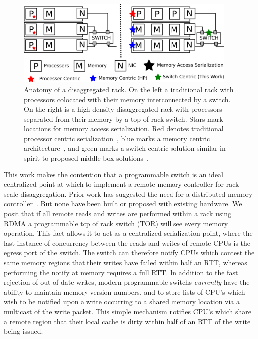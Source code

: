 \begin{figure}
      \centering
      \includegraphics[width=0.95\textwidth]{fig/overview.png}
      \caption{Anatomy of a disaggregated rack. On the left a
      traditional rack with processors colocated with their memory
      interconnected by a switch. On the right is a high density
      disaggregated rack with processors separated from their memory
      by a top of rack switch. Stars mark locations for memory access
      serialization. Red denotes traditional processor centric
      serialization~\cite{clover, storm, memc3, cell, sonuma}, blue marks a
      memory centric architecture~\cite{aguilera2019designing}, and
      green marks a switch centric solution similar in spirit to
      proposed middle box solutions~\cite{254120}.
      }
      \label{fig:overview}
\end{figure}


This work makes the contention that a programmable switch is an ideal
centralized point at which to implement a remote memory controller for
rack scale disaggregation. Prior work has suggested the need for a
distributed memory controller~\cite{254120}. But none have been built
or proposed with existing hardware. We posit that if all remote reads
and writes are performed within a rack using RDMA a programmable top
of rack switch (TOR) will see every memory operation. This fact allows
it to act as a centralized serialization point, where the last
instance of concurrency between the reads and writes of remote CPUs is
the egress port of the switch. The switch can therefore notify CPUs
which contest the same memory regions that their writes have failed
within half an RTT, whereas performing the notify at memory requires a
full RTT. In addition to the fast rejection of out of date writes,
modern programmable switchs \textit{currently} have the ability to
maintain memory version numbers, and to store lists of CPU's which
wish to be notified upon a write occurring to a shared memory location
via a multicast of the write packet. This simple mechanism notifies
CPU's which share a remote region that their local cache is dirty
within half of an RTT of the write being issued. 

